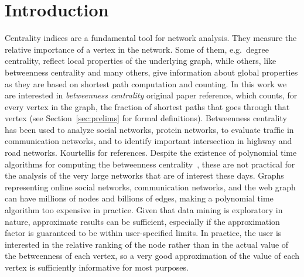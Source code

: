 \section{Introduction}\label{sec:intro}
Centrality indices are a fundamental tool for network analysis. They measure the
relative importance of a vertex in the network. Some of them, e.g.~degree
centrality, reflect local properties of the underlying graph, while others,
like betweenness centrality and many others, give information about global
properties as they are based on shortest path computation and counting. In this
work we are interested in \emph{betweenness centrality} \XXX original paper
reference, which counts, for every vertex in the graph, the fraction of shortest
paths that goes through that vertex (see Section~\ref{sec:prelims} for formal
definitions). Betweenness centrality has been used to analyze social networks,
protein networks, to evaluate traffic in communication networks, and to identify
important intersection in highway and road networks. \XXX Kourtellis for
references. Despite the existence of polynomial time algorithms for computing
the betweenness centrality~\citep{Brandes01}, these are not practical for the
analysis of the very large networks that are of interest these days. Graphs
representing online social networks, communication networks, and the web graph
can have millions of nodes and billions of edges, making a polynomial time
algorithm too expensive in practice. Given that data mining is exploratory in
nature, approximate results can be sufficient, especially if the approximation
factor is guaranteed to be within user-specified limits. In practice, the user
is interested in the relative ranking of the node rather than in the actual
value of the betweenness of each vertex, so a very good approximation of the
value of each vertex is sufficiently informative for most purposes.

